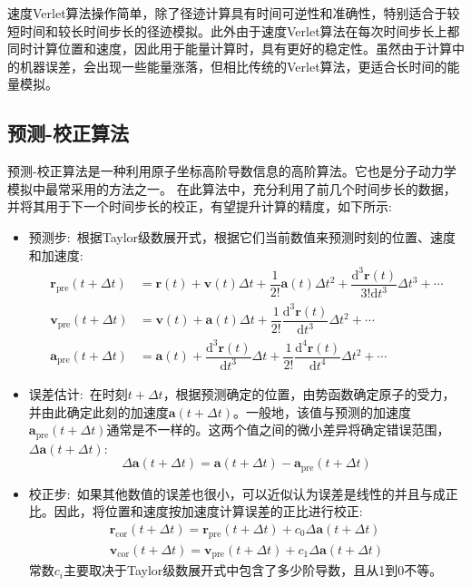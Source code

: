 速度\textrm{Verlet}算法操作简单，除了径迹计算具有时间可逆性和准确性，特别适合于较短时间和较长时间步长的径迹模拟。此外由于速度\textrm{Verlet}算法在每次时间步长上都同时计算位置和速度，因此用于能量计算时，具有更好的稳定性。虽然由于计算中的机器误差，会出现一些能量涨落，但相比传统的\textrm{Verlet}算法，更适合长时间的能量模拟。
\subsection{预测-校正算法}
预测-校正算法\cite{PR136-405_1964}是一种利用原子坐标高阶导数信息的高阶算法。它也是分子动力学模拟中最常采用的方法之一。
在此算法中，充分利用了前几个时间步长的数据，并将其用于下一个时间步长的校正，有望提升计算的精度，如下所示:
\begin{itemize}
	\item 预测步:~根据\textrm{Taylor}级数展开式，根据它们当前数值来预测时刻的位置、速度和加速度:
		\begin{equation}
			\begin{aligned}
			\mathbf{r}_{\mathrm{pre}}(t+\Delta t)&=\mathbf{r}(t)+\mathbf{v}(t)\Delta t+\dfrac1{2!}\mathbf{a}(t)\Delta t^2+\dfrac{\mathrm{d}^3\mathbf{r}(t)}{3!\mathrm{d}t^3}\Delta t^3+\cdots\\
			\mathbf{v}_{\mathrm{pre}}(t+\Delta t)&=\mathbf{v}(t)+\mathbf{a}(t)\Delta t+\dfrac1{2!}\dfrac{\mathrm{d}^3\mathbf{r}(t)}{\mathrm{d}t^3}\Delta t^2+\cdots\\
			\mathbf{a}_{\mathrm{pre}}(t+\Delta t)&=\mathbf{a}(t)+\dfrac{\mathrm{d}^3\mathbf{r}(t)}{\mathrm{d}t^3}\Delta t+\dfrac1{2!}\dfrac{\mathrm{d}^4\mathbf{r}(t)}{\mathrm{d}t^4}\Delta t^2+\cdots
			\end{aligned}
			\label{eq:Predict}
		\end{equation}
	\item 误差估计:~在时刻$t+\Delta t$，根据预测确定的位置，由势函数确定原子的受力，并由此确定此刻的加速度$\mathbf{a}(t+\Delta t)$。一般地，该值与预测的加速度$\mathbf{a}_{\mathrm{pre}}(t+\Delta t)$通常是不一样的。这两个值之间的微小差异将确定错误范围，$\Delta\mathbf{a}(t+\Delta t)$:
		\begin{equation}
			\Delta\mathbf{a}(t+\Delta t)=\mathbf{a}(t+\Delta t)-\mathbf{a}_{\mathrm{pre}}(t+\Delta t)
			\label{eq:Delta_a}
		\end{equation}
	\item 校正步:~如果其他数值的误差也很小，可以近似认为误差是线性的并且与成正比。因此，将位置和速度按加速度计算误差的正比进行校正:
		\begin{equation}
			\begin{aligned}
				\mathbf{r}_{\mathrm{cor}}(t+\Delta t)=\mathbf{r}_{\mathrm{pre}}(t+\Delta t)+c_0\Delta\mathbf{a}(t+\Delta t)\\
				\mathbf{v}_{\mathrm{cor}}(t+\Delta t)=\mathbf{v}_{\mathrm{pre}}(t+\Delta t)+c_1\Delta\mathbf{a}(t+\Delta t)
			\end{aligned}
			\label{eq:Correct}
		\end{equation}
		常数$c_i$主要取决于\textrm{Taylor}级数展开式中包含了多少阶导数，且从1到0不等。
\end{itemize}
